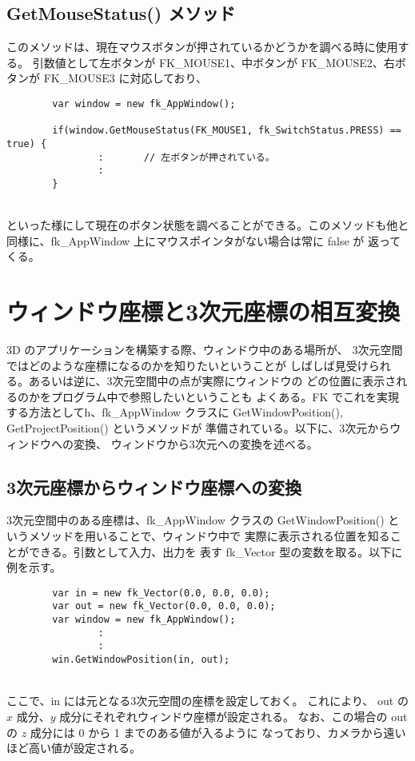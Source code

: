 \subsection{GetMouseStatus() メソッド}
このメソッドは、現在マウスボタンが押されているかどうかを調べる時に使用する。
引数値として左ボタンが FK\_MOUSE1、中ボタンが FK\_MOUSE2、右ボタンが
FK\_MOUSE3 に対応しており、
\\
\begin{breakbox}
\begin{verbatim}
        var window = new fk_AppWindow();

        if(window.GetMouseStatus(FK_MOUSE1, fk_SwitchStatus.PRESS) == true) {
                :       // 左ボタンが押されている。
                :
        }
\end{verbatim}
\end{breakbox}
~ \\
といった様にして現在のボタン状態を調べることができる。このメソッドも他と
同様に、fk\_AppWindow 上にマウスポインタがない場合は常に false が
返ってくる。

\section{ウィンドウ座標と3次元座標の相互変換} \label{sec:coordinate}
3D のアプリケーションを構築する際、ウィンドウ中のある場所が、
3次元空間ではどのような座標になるのかを知りたいということが
しばしば見受けられる。あるいは逆に、3次元空間中の点が実際にウィンドウの
どの位置に表示されるのかをプログラム中で参照したいということも
よくある。FK でこれを実現する方法としてh、fk\_AppWindow クラスに
GetWindowPosition(), GetProjectPosition() というメソッドが
準備されている。以下に、3次元からウィンドウへの変換、
ウィンドウから3次元への変換を述べる。

\subsection{3次元座標からウィンドウ座標への変換}
3次元空間中のある座標は、fk\_AppWindow クラスの
GetWindowPosition() というメソッドを用いることで、ウィンドウ中で
実際に表示される位置を知ることができる。引数として入力、出力を
表す fk\_Vector 型の変数を取る。以下に例を示す。
\\
\begin{breakbox}
\begin{verbatim}
        var in = new fk_Vector(0.0, 0.0, 0.0);
        var out = new fk_Vector(0.0, 0.0, 0.0);
        var window = new fk_AppWindow();
                :
                :
        win.GetWindowPosition(in, out);
\end{verbatim}
\end{breakbox}
~ \\
ここで、in には元となる3次元空間の座標を設定しておく。
これにより、
out の \(x\) 成分、\(y\) 成分にそれぞれウィンドウ座標が設定される。
なお、この場合の out の \(z\) 成分には 0 から 1 までのある値が入るように
なっており、カメラから遠いほど高い値が設定される。

